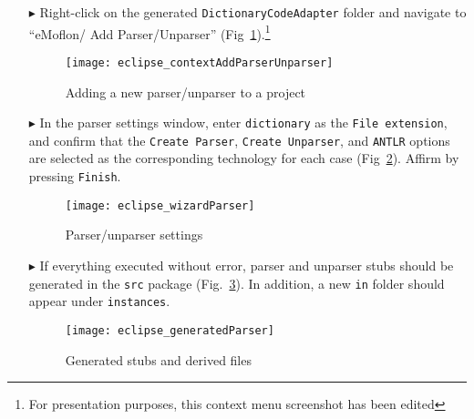 \begin{itemize}

\item[$\blacktriangleright$] Right-click on the generated \texttt{DictionaryCodeAdapter} folder and navigate to ``eMoflon/ Add Parser/Unparser''
(Fig~\ref{eclipse:contextParser}).\footnote{For presentation purposes, this context menu screenshot has been edited}

\vspace{0.5cm}

\begin{figure}[htpb]
\begin{center}
  \texttt{[image: eclipse\_contextAddParserUnparser]}
  \caption{Adding a new parser/unparser to a project}
  \label{eclipse:contextParser}
\end{center}
\end{figure}


\item[$\blacktriangleright$] In the parser settings window, enter \texttt{dictionary} as the \texttt{File exten\-si\-on}, and confirm that the \texttt{Create
Parser}, \texttt{Create Unparser}, and \texttt{ANTLR} options are selected as the corresponding technology for each case (Fig~\ref{eclipse:wizardParser}).
Affirm by pressing \texttt{Finish}.

\begin{figure}[htpb]
\begin{center}
  \texttt{[image: eclipse\_wizardParser]}
  \caption{Parser/unparser settings}
  \label{eclipse:wizardParser}
\end{center}
\end{figure}


\item[$\blacktriangleright$] If everything executed without error, parser and unparser stubs should be generated in the \texttt{src} package
(Fig.~\ref{eclipse:generatedParser}). In addition, a new \texttt{in} folder should appear under \texttt{instances}. 

\begin{figure}[htpb]
\begin{center}
  \texttt{[image: eclipse\_generatedParser]}
  \caption{Generated stubs and derived files}
  \label{eclipse:generatedParser}
\end{center}
\end{figure}

\end{itemize}
